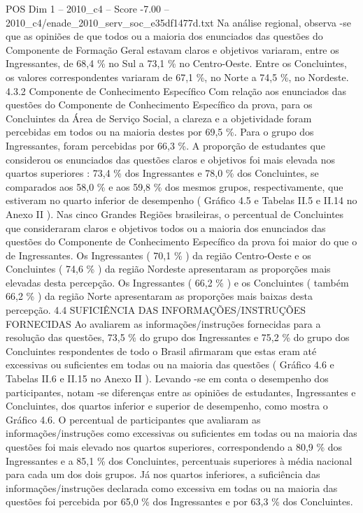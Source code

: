 \begin{textsample}{POS Dim 1 – 2010\_c4 – Score -7.00 – 2010\_c4/enade\_2010\_serv\_soc\_e35df1477d.txt}
Na análise regional, observa -se que as opiniões de que todos ou a maioria dos enunciados das questões do Componente de Formação Geral estavam claros e objetivos variaram, entre os Ingressantes, de 68,4 \% no Sul a 73,1 \% no Centro-Oeste.
Entre os Concluintes, os valores correspondentes variaram de 67,1 \%, no Norte a 74,5 \%, no Nordeste. 4.3.2 Componente de Conhecimento Específico Com relação aos enunciados das questões do Componente de Conhecimento Específico da prova, para os Concluintes da Área de Serviço Social, a clareza e a objetividade foram percebidas em todos ou na maioria destes por 69,5 \%.
Para o grupo dos Ingressantes, foram percebidas por 66,3 \%.
A proporção de estudantes que considerou os enunciados das questões claros e objetivos foi mais elevada nos quartos superiores : 73,4 \% dos Ingressantes e 78,0 \% dos Concluintes, se comparados aos 58,0 \% e aos 59,8 \% dos mesmos grupos, respectivamente, que estiveram no quarto inferior de desempenho ( Gráfico 4.5 e Tabelas II.5 e II.14 no Anexo II ).
Nas cinco Grandes Regiões brasileiras, o percentual de Concluintes que consideraram claros e objetivos todos ou a maioria dos enunciados das questões do Componente de Conhecimento Específico da prova foi maior do que o de Ingressantes.
Os Ingressantes ( 70,1 \% ) da região Centro-Oeste e os Concluintes ( 74,6 \% ) da região Nordeste apresentaram as proporções mais elevadas desta percepção.
Os Ingressantes ( 66,2 \% ) e os Concluintes ( também 66,2 \% ) da região Norte apresentaram as proporções mais baixas desta percepção. 4.4 SUFICIÊNCIA DAS INFORMAÇÕES/INSTRUÇÕES FORNECIDAS Ao avaliarem as informações/instruções fornecidas para a resolução das questões, 73,5 \% do grupo dos Ingressantes e 75,2 \% do grupo dos Concluintes respondentes de todo o Brasil afirmaram que estas eram até excessivas ou suficientes em todas ou na maioria das questões ( Gráfico 4.6 e Tabelas II.6 e II.15 no Anexo II ).
Levando -se em conta o desempenho dos participantes, notam -se diferenças entre as opiniões de estudantes, Ingressantes e Concluintes, dos quartos inferior e superior de desempenho, como mostra o Gráfico 4.6.
O percentual de participantes que avaliaram as informações/instruções como excessivas ou suficientes em todas ou na maioria das questões foi mais elevado nos quartos superiores, correspondendo a 80,9 \% dos Ingressantes e a 85,1 \% dos Concluintes, percentuais superiores à média nacional para cada um dos dois grupos.
Já nos quartos inferiores, a suficiência das informações/instruções declarada como excessiva em todas ou na maioria das questões foi percebida por 65,0 \% dos Ingressantes e por 63,3 \% dos Concluintes.

\end{textsample}
